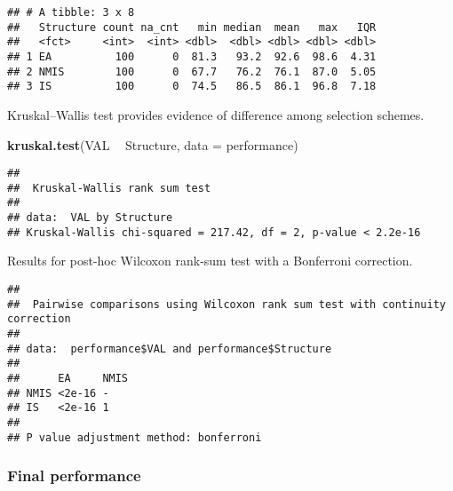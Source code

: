 \documentclass[]{book}
\newenvironment{Shaded}{\begin{snugshade}}{\end{snugshade}}
\newcommand{\DataTypeTok}[1]{\textcolor[rgb]{0.13,0.29,0.53}{#1}}
\newcommand{\KeywordTok}[1]{\textcolor[rgb]{0.13,0.29,0.53}{\textbf{#1}}}
\newcommand{\NormalTok}[1]{#1}
\newcommand{\OperatorTok}[1]{\textcolor[rgb]{0.81,0.36,0.00}{\textbf{#1}}}
\newcommand{\OtherTok}[1]{\textcolor[rgb]{0.56,0.35,0.01}{#1}}
\newcommand{\StringTok}[1]{\textcolor[rgb]{0.31,0.60,0.02}{#1}}
\begin{document}
\begin{verbatim}
## # A tibble: 3 x 8
##   Structure count na_cnt   min median  mean   max   IQR
##   <fct>     <int>  <int> <dbl>  <dbl> <dbl> <dbl> <dbl>
## 1 EA          100      0  81.3   93.2  92.6  98.6  4.31
## 2 NMIS        100      0  67.7   76.2  76.1  87.0  5.05
## 3 IS          100      0  74.5   86.5  86.1  96.8  7.18
\end{verbatim}

Kruskal--Wallis test provides evidence of difference among selection schemes.

\begin{Shaded}
\begin{Highlighting}[]
\KeywordTok{kruskal.test}\NormalTok{(VAL }\OperatorTok{~}\StringTok{ }\NormalTok{Structure, }\DataTypeTok{data =}\NormalTok{ performance)}
\end{Highlighting}
\end{Shaded}

\begin{verbatim}
## 
##  Kruskal-Wallis rank sum test
## 
## data:  VAL by Structure
## Kruskal-Wallis chi-squared = 217.42, df = 2, p-value < 2.2e-16
\end{verbatim}

Results for post-hoc Wilcoxon rank-sum test with a Bonferroni correction.

\begin{Shaded}
\end{Shaded}

\begin{verbatim}
## 
##  Pairwise comparisons using Wilcoxon rank sum test with continuity correction 
## 
## data:  performance$VAL and performance$Structure 
## 
##      EA     NMIS
## NMIS <2e-16 -   
## IS   <2e-16 1   
## 
## P value adjustment method: bonferroni
\end{verbatim}

\hypertarget{final-performance-7}{%
\subsubsection{Final performance}\label{final-performance-7}}
\end{document}
